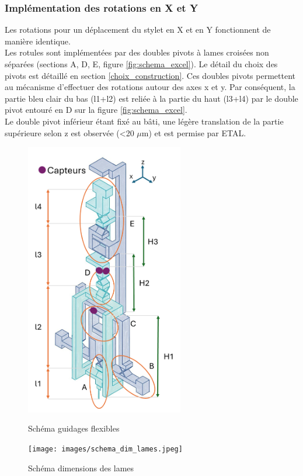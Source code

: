 \documentclass[a4paper, 11pt]{article} %
\begin{document}
\subsubsection*{Implémentation des rotations en X et Y}
Les rotations pour un déplacement du stylet en X et en Y fonctionnent de manière identique. \\
Les rotules sont implémentées par des doubles pivots à lames croisées non séparées (sections A, D, E, figure \ref{fig:schema_excel}). Le détail du choix des pivots est détaillé en section \ref{choix_construction}. 
Ces doubles pivots permettent au mécanisme d'effectuer des rotations autour des axes x et y. Par conséquent, la partie bleu clair du bas (l1+l2) est reliée à la partie du haut (l3+l4) par le double pivot entouré en D sur la figure \ref{fig:schema_excel}. \\ Le double pivot inférieur étant fixé au bâti, une légère translation de la partie supérieure selon z est observée (<20 $\mu $m) et est permise par ETAL.


\begin{figure}[H]
    \centering

    \begin{minipage}[b]{0.4\linewidth}
        \centering
        \includegraphics[height=12cm]{images/schema_dimensions.png}
        \caption{Schéma guidages flexibles }
        \label{fig:schema_excel}
    \end{minipage}
    \hfill
    \begin{minipage}[b]{0.59\linewidth} %
        \centering
        \texttt{[image: images/schema\_dim\_lames.jpeg]}
        \caption{Schéma dimensions des lames}
        \label{fig:schema_dimensions}
    \end{minipage}
\end{figure}
\vspace{3em}
\end{document}

